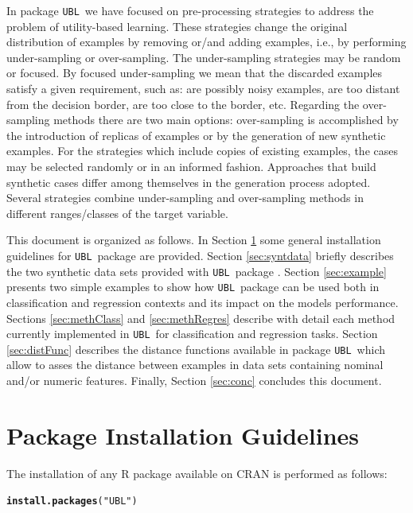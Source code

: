 \documentclass[10pt,a4paper]{article}\usepackage[]{graphicx}\usepackage[]{color}
\makeatletter
\newcommand{\hlstr}[1]{\textcolor[rgb]{0.192,0.494,0.8}{#1}}%
\newcommand{\hlstd}[1]{\textcolor[rgb]{0.345,0.345,0.345}{#1}}%
\newcommand{\hlkwd}[1]{\textcolor[rgb]{0.737,0.353,0.396}{\textbf{#1}}}%
\newenvironment{kframe}{%
 \def\at@end@of@kframe{}%
 \ifinner\ifhmode%
  \def\at@end@of@kframe{\end{minipage}}%
  \begin{minipage}{\columnwidth}%
 \fi\fi%
 \def\FrameCommand##1{\hskip\@totalleftmargin \hskip-\fboxsep
 \colorbox{shadecolor}{##1}\hskip-\fboxsep
     \hskip-\linewidth \hskip-\@totalleftmargin \hskip\columnwidth}%
 \MakeFramed {\advance\hsize-\width
   \@totalleftmargin\z@ \linewidth\hsize
   \@setminipage}}%
 {\par\unskip\endMakeFramed%
 \at@end@of@kframe}
\newenvironment{knitrout}{}{} %
\newcommand{\UBL}{\texttt{UBL}\ }
\newcommand{\pUBL}{package \texttt{UBL}\ }
\newcommand{\UBLp}{\texttt{UBL}\ package  }
\makeatother
\begin{document}
In \pUBL we have focused on pre-processing strategies to address the problem of utility-based learning. These strategies change the original distribution of examples by removing or/and adding examples, i.e., by performing under-sampling or over-sampling. The under-sampling strategies may be random or focused. By focused under-sampling we mean that the discarded examples satisfy a given requirement, such as: are possibly noisy examples, are too distant from the decision border, are too close to the border, etc. Regarding the over-sampling methods there are two main options: over-sampling is accomplished by the introduction of replicas of examples or by the generation of new synthetic examples. For the strategies which include copies of existing examples, the cases may be selected randomly or in an informed fashion. Approaches that build synthetic cases differ among themselves in the generation process adopted. Several strategies combine under-sampling and over-sampling methods in different ranges/classes of the target variable.

This document is organized as follows. In Section \ref{sec:instal} some general installation guidelines for \UBLp are provided. Section \ref{sec:syntdata} briefly describes the two synthetic data sets provided with \UBLp. Section \ref{sec:example} presents two simple examples to show how \UBLp can be used both in classification and regression contexts and its impact on the models performance. Sections \ref{sec:methClass} and \ref{sec:methRegres} describe with detail each method currently implemented in \UBL for classification and regression tasks. Section \ref{sec:distFunc} describes the distance functions available in \pUBL which allow to asses the distance between examples in data sets containing nominal and/or numeric features. Finally, Section \ref{sec:conc} concludes this document.

\section{Package Installation Guidelines}\label{sec:instal}

The installation of any R package available on CRAN is performed as follows:
\begin{knitrout}\footnotesize
{}\color{fgcolor}\begin{kframe}
\begin{alltt}
\hlkwd{install.packages}\hlstd{(}\hlstr{"UBL"}\hlstd{)}
\end{alltt}
\end{kframe}
\end{knitrout}
\end{document}

